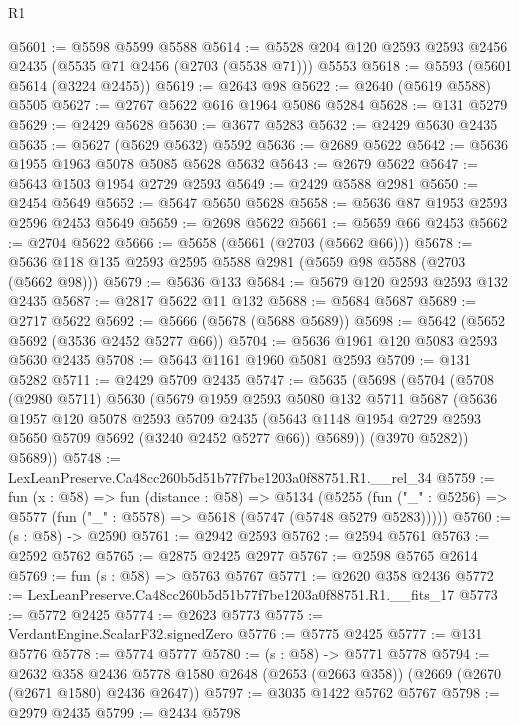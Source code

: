 \begin{lexlean}{R1}
\begin{coremodule}
@5601 := @5598 @5599 @5588
@5614 := @5528 @204 @120 @2593 @2593 @2456 @2435 (@5535 @71 @2456 (@2703 (@5538 @71))) @5553
@5618 := @5593 (@5601 @5614 (@3224 @2455))
@5619 := @2643 @98
@5622 := @2640 (@5619 @5588) @5505
@5627 := @2767 @5622 @616 @1964 @5086 @5284
@5628 := @131 @5279
@5629 := @2429 @5628
@5630 := @3677 @5283
@5632 := @2429 @5630 @2435
@5635 := @5627 (@5629 @5632) @5592
@5636 := @2689 @5622
@5642 := @5636 @1955 @1963 @5078 @5085 @5628 @5632
@5643 := @2679 @5622
@5647 := @5643 @1503 @1954 @2729 @2593
@5649 := @2429 @5588 @2981
@5650 := @2454 @5649
@5652 := @5647 @5650 @5628
@5658 := @5636 @87 @1953 @2593 @2596 @2453 @5649
@5659 := @2698 @5622
@5661 := @5659 @66 @2453
@5662 := @2704 @5622
@5666 := @5658 (@5661 (@2703 (@5662 @66)))
@5678 := @5636 @118 @135 @2593 @2595 @5588 @2981 (@5659 @98 @5588 (@2703 (@5662 @98)))
@5679 := @5636 @133
@5684 := @5679 @120 @2593 @2593 @132 @2435
@5687 := @2817 @5622 @11 @132
@5688 := @5684 @5687
@5689 := @2717 @5622
@5692 := @5666 (@5678 (@5688 @5689))
@5698 := @5642 (@5652 @5692 (@3536 @2452 @5277 @66))
@5704 := @5636 @1961 @120 @5083 @2593 @5630 @2435
@5708 := @5643 @1161 @1960 @5081 @2593
@5709 := @131 @5282
@5711 := @2429 @5709 @2435
@5747 := @5635
    (@5698
      (@5704
        (@5708
          (@2980 @5711)
          @5630
          (@5679
            @1959
            @2593
            @5080
            @132
            @5711
            @5687
            (@5636
              @1957
              @120
              @5078
              @2593
              @5709
              @2435
              (@5643 @1148 @1954 @2729 @2593 @5650 @5709 @5692 (@3240 @2452 @5277 @66))
              @5689))
          (@3970 @5282))
        @5689))
@5748 := LexLeanPreserve.Ca48cc260b5d51b77f7be1203a0f88751.R1.__rel_34
@5759 := fun (x : @58) =>
  fun (distance : @58) =>
  @5134
    (@5255 (fun ("_" : @5256) => @5577 (fun ("_" : @5578) => @5618 (@5747 (@5748 @5279 @5283)))))
@5760 := (s : @58) -> @2590
@5761 := @2942 @2593
@5762 := @2594 @5761
@5763 := @2592 @5762
@5765 := @2875 @2425 @2977
@5767 := @2598 @5765 @2614
@5769 := fun (s : @58) => @5763 @5767
@5771 := @2620 @358 @2436
@5772 := LexLeanPreserve.Ca48cc260b5d51b77f7be1203a0f88751.R1.__fits_17
@5773 := @5772 @2425
@5774 := @2623 @5773
@5775 := VerdantEngine.ScalarF32.signedZero
@5776 := @5775 @2425
@5777 := @131 @5776
@5778 := @5774 @5777
@5780 := (s : @58) -> @5771 @5778
@5794 := @2632
    @358
    @2436
    @5778
    @1580
    @2648
    (@2653 (@2663 @358))
    (@2669 (@2670 (@2671 @1580) @2436 @2647))
@5797 := @3035 @1422 @5762 @5767
@5798 := @2979 @2435
@5799 := @2434 @5798

\end{coremodule}
\end{lexlean}
